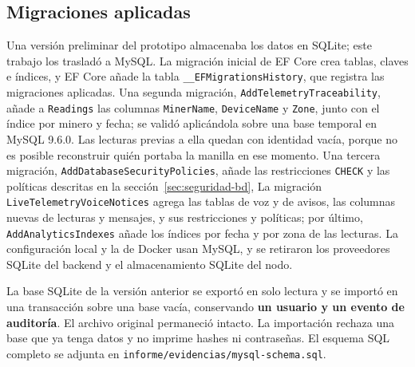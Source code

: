 \documentclass[10pt,a4paper]{article}
\newcommand{\code}[1]{{\small\urlstyle{tt}\nolinkurl{#1}}}
\begin{document}
\subsection{Migraciones aplicadas}
Una versión preliminar del prototipo almacenaba los datos en SQLite; este trabajo los trasladó a MySQL. La migración inicial de EF Core crea tablas, claves e índices, y EF Core añade la tabla \code{__EFMigrationsHistory}, que registra las migraciones aplicadas. Una segunda migración, \code{AddTelemetryTraceability}, añade a \code{Readings} las columnas \code{MinerName}, \code{DeviceName} y \code{Zone}, junto con el índice por minero y fecha; se validó aplicándola sobre una base temporal en MySQL 9.6.0. Las lecturas previas a ella quedan con identidad vacía, porque no es posible reconstruir quién portaba la manilla en ese momento. Una tercera migración, \code{AddDatabaseSecurityPolicies}, añade las restricciones \code{CHECK} y las políticas descritas en la sección~\ref{sec:seguridad-bd}, La migración \code{LiveTelemetryVoiceNotices} agrega las tablas de voz y de avisos, las columnas nuevas de lecturas y mensajes, y sus restricciones y políticas; por último, \code{AddAnalyticsIndexes} añade los índices por fecha y por zona de las lecturas. La configuración local y la de Docker usan MySQL, y se retiraron los proveedores SQLite del backend y el almacenamiento SQLite del nodo.

La base SQLite de la versión anterior se exportó en solo lectura y se importó en una transacción sobre una base vacía, conservando \textbf{un usuario y un evento de auditoría}. El archivo original permaneció intacto. La importación rechaza una base que ya tenga datos y no imprime hashes ni contraseñas. El esquema SQL completo se adjunta en \code{informe/evidencias/mysql-schema.sql}.
\end{document}
